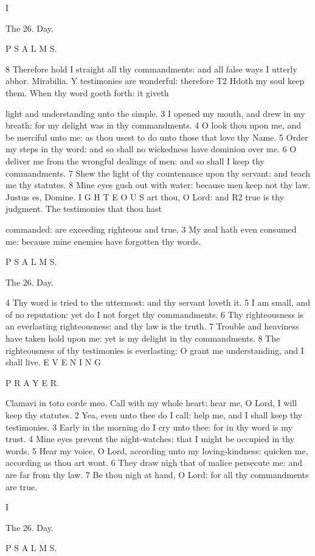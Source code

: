 I

The 26. Day.

P S A L M S.

8 Therefore hold I straight all thy commandments: and all false ways I utterly abhor. Mirabilia. Y testimonies are wonderful: therefore T2 Hdoth my soul keep them. When thy word goeth forth: it giveth

light and understanding unto the simple. 3 I opened my mouth, and drew in my breath: for my delight was in thy commandments. 4 O look thou upon me, and be merciful unto me: as thou usest to do unto those that love thy Name. 5 Order my steps in thy word: and so shall no wickedness have dominion over me. 6 O deliver me from the wrongful dealings of men: and so shall I keep thy commandments. 7 Shew the light of thy countenance upon thy servant: and teach me thy statutes. 8 Mine eyes gush out with water: because men keep not thy law. Justus es, Domine. I G H T E O U S art thou, O Lord: and R2 true is thy judgment. The testimonies that thou hast

commanded: are exceeding righteous and true. 3 My zeal hath even consumed me: because mine enemies have forgotten thy words.

P S A L M S.

The 26. Day.

4 Thy word is tried to the uttermost: and thy servant loveth it. 5 I am small, and of no reputation: yet do I not forget thy commandments. 6 Thy righteousness is an everlasting righteousness: and thy law is the truth. 7 Trouble and heaviness have taken hold upon me: yet is my delight in thy commandments. 8 The righteousness of thy testimonies is everlasting: O grant me understanding, and I shall live. E V E N I N G

P R A Y E R.

Clamavi in toto corde meo. Call with my whole heart: hear me, O Lord, I will keep thy statutes. 2 Yea, even unto thee do I call: help me, and I shall keep thy testimonies. 3 Early in the morning do I cry unto thee: for in thy word is my trust. 4 Mine eyes prevent the night-watches: that I might be occupied in thy words. 5 Hear my voice, O Lord, according unto my loving-kindness: quicken me, according as thou art wont. 6 They draw nigh that of malice persecute me: and are far from thy law. 7 Be thou nigh at hand, O Lord: for all thy commandments are true.

I

The 26. Day.

P S A L M S.

